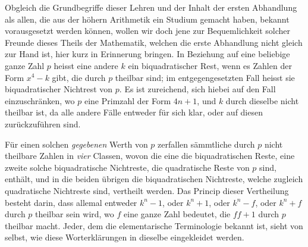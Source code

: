 Obgleich die Grundbegriffe dieser Lehren und der Inhalt der ersten Abhandlung als allen, die aus der höhern Arithmetik ein Studium gemacht haben, bekannt vorausgesetzt werden können, wollen wir doch jene zur Bequemlichkeit solcher Freunde dieses Theils der Mathematik, welchen die erste Abhandlung nicht gleich zur Hand ist, hier kurz in Erinnerung bringen. In Beziehung auf eine beliebige ganze Zahl $p$ heisst eine andere $k$ ein biquadratischer Rest, wenn es Zahlen der Form $x^4-k$ gibt, die durch $p$ theilbar sind; im entgegengesetzten Fall heisst sie biquadratischer Nichtrest von $p$. Es ist zureichend, sich hiebei auf den Fall einzuschränken, wo $p$ eine Primzahl der Form $4n+1$, und $k$ durch
%
dieselbe nicht theilbar ist, da alle andere Fälle entweder für sich klar, oder auf diesen zurückzuführen sind.

Für einen solchen \emph{gegebenen} Werth von $p$ zerfallen sämmtliche durch $p$ nicht theilbare Zahlen in \emph{vier} Classen, wovon die eine die biquadratischen Reste, eine zweite solche biquadratische Nichtreste, die quadratische Reste von $p$ sind, enthält, und in die beiden übrigen die biquadratischen Nichtreste, welche zugleich quadratische Nichtreste sind, vertheilt werden. Das Princip dieser Vertheilung besteht darin, dass allemal entweder $k^n-1$, oder $k^n+1$, oder $k^n-f$, oder $k^n+f$ durch $p$ theilbar sein wird, wo $f$ eine ganze Zahl bedeutet, die $ff+1$ durch $p$ theilbar macht. Jeder, dem die elementarische Terminologie bekannt ist, sieht von selbst, wie diese Worterklärungen in dieselbe eingekleidet werden.

